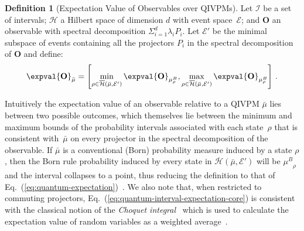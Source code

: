 \documentclass[english,reprint, aps, prl,superscriptaddress, showpacs,
showkeys, longbibliography, amsmath, amssymb, floatfix]{revtex4-1}
\theoremstyle{plain}
\theoremstyle{definition}
\newtheorem{definition}{Definition}
\newcommand{\Hilb}{\mathcal{H}}
\newcommand{\events}{\ensuremath{\mathcal{E}}}
\newcommand{\proj}[1]{\op{#1}{#1}}
\newcommand{\ps}{\texttt{+}}
\newcommand{\coreBorn}{\ensuremath{\overline{\Hilb}}}
\newcommand{\muB}{\ensuremath{\mu^{B}}}
\begin{document}
\begin{definition}[Expectation Value of Observables over QIVPMs] Let
  $\mathscr{I}$ be a set of intervals; $\Hilb$ a Hilbert space of
  dimension $d$ with event space~$\events$; and $\mathbf{O}$ an
  observable with spectral decomposition
  $\Sigma_{i=1}^d \lambda_iP_i$. Let $\events'$ be the minimal
  subspace of events containing all the projectors $P_i$ in the
  spectral decomposition of $\mathbf{O}$ and define:
\begin{equation}
\expval{\mathbf{O}}_{\bar{\mu}}=\left[\min_{\rho\in\coreBorn\left(\bar{\mu},\events'\right)}
\expval{\mathbf{O}}_{\muB_{\rho}},\max_{\rho\in\coreBorn\left(\bar{\mu},\events'\right)}
\expval{\mathbf{O}}_{\muB_{\rho}}\right]\,. \label{eq:quantum-interval-expectation-core}
\end{equation}
\end{definition}

\noindent Intuitively the expectation value of an observable relative
to a QIVPM $\bar{\mu}$ lies between two possible outcomes, which
themselves lie between the minimum and maximum bounds of the
probability intervals associated with each state~$\rho$ that is
consistent with~$\bar{\mu}$ on every projector in the spectral
decomposition of the observable. If $\bar{\mu}$ is a conventional
(Born) probability measure induced by a state $\rho$, then the Born
rule probability induced by every state in
$\coreBorn\left(\bar{\mu},\events'\right)$ will be
$\muB_{\rho}$ and the interval collapses to a point, thus
reducing the definition to that of
Eq.~(\ref{eq:quantum-expectation})~\cite{TaiThesis2018}.
We also note that, when restricted to commuting projectors,
Eq.~(\ref{eq:quantum-interval-expectation-core}) is consistent with
the classical notion of the \emph{Choquet
  integral}~\cite{Choquet1954,GilboaSchmeidler1994,Grabisch2016}
which is used to calculate the expectation value of random variables
as a weighted average~\cite{TaiThesis2018}.
\end{document}
